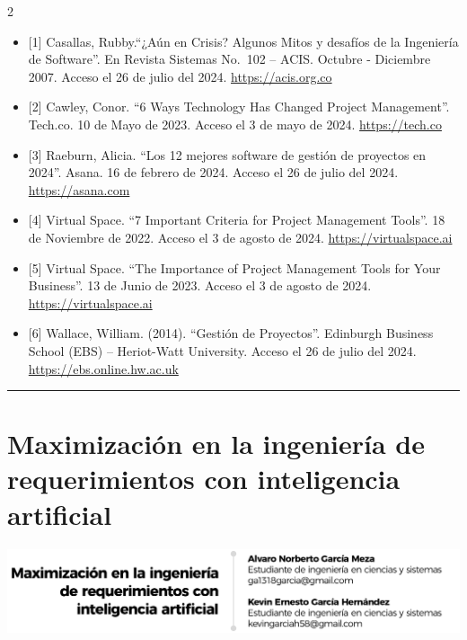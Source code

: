 \documentclass[12pt,spanish,Letterpaper,openany]{book}
\newcommand{\HRule}{\begin{center}\rule{0.5\linewidth}{0.2mm}\end{center}}
\begin{document}
\begin {multicols}{2}
\begin{itemize}
\item
  {[}1{]} Casallas, Rubby.``¿Aún en Crisis? Algunos Mitos y desafíos de la Ingeniería de Software''. En Revista Sistemas No.~102 -- ACIS. Octubre - Diciembre 2007. Acceso el 26 de julio del 2024. \href{https://acis.org.co/portal/Revista/102/columnista.pdf}{https://acis.org.co}
\item
  {[}2{]} Cawley, Conor. ``6 Ways Technology Has Changed Project Management''. Tech.co. 10 de Mayo de 2023. Acceso el 3 de mayo de 2024. \href{https://tech.co/project-managementsoftware/ways-technology-has-changed-project-management}{https://tech.co}
\item
  {[}3{]} Raeburn, Alicia. ``Los 12 mejores software de gestión de proyectos en 2024''. Asana. 16 de febrero de 2024. Acceso el 26 de julio del 2024. \href{https://asana.com/es/resources/best-project-management-software}{https://asana.com}
\item
  {[}4{]} Virtual Space. ``7 Important Criteria for Project Management Tools''. 18 de Noviembre de 2022. Acceso el 3 de agosto de 2024. \href{https://virtualspace.ai/blogs/7-important-criteria-for-project-management-tools}{https://virtualspace.ai}
\item
  {[}5{]} Virtual Space. ``The Importance of Project Management Tools for Your Business''. 13 de Junio de 2023. Acceso el 3 de agosto de 2024. \href{https://virtualspace.ai/blogs/the-importance-of-project-management-tools-for-your-business}{https://virtualspace.ai}
\item
  {[}6{]} Wallace, William. (2014). ``Gestión de Proyectos''. Edinburgh Business School (EBS) -- Heriot-Watt University. Acceso el 26 de julio del 2024. \href{https://ebs.online.hw.ac.uk/documents/course-tasters/spanish/pdf/pr-bk-taster.pdf}{https://ebs.online.hw.ac.uk}
\end{itemize}

\end {multicols}

\medskip

\HRule

\medskip

\hypertarget{pareja33}{%
\chapter{Maximización en la ingeniería de requerimientos con inteligencia artificial}\label{pareja33}}

\begin{center}\includegraphics[width=1\linewidth]{autores/pareja33_01} \end{center}
\end{document}
